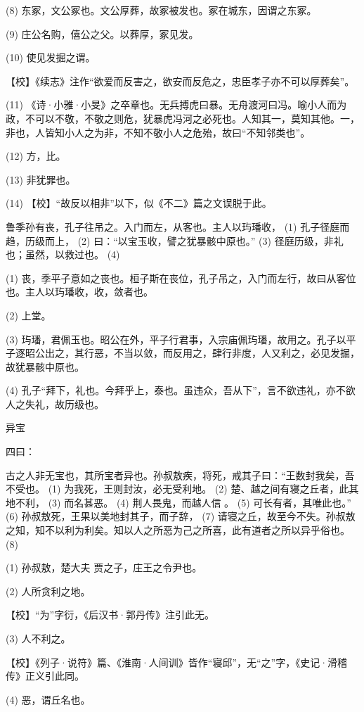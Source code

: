 \documentclass[12pt,UTF8]{ctexbook}
\begin{document}
(8) 东冢，文公冢也。文公厚葬，故冢被发也。冢在城东，因谓之东冢。

(9) 庄公名购，僖公之父。以葬厚，冢见发。

(10) 使见发掘之谓。

【校】《续志》注作“欲爱而反害之，欲安而反危之，忠臣孝子亦不可以厚葬矣”。

(11) 《诗·小雅·小旻》之卒章也。无兵搏虎曰暴。无舟渡河曰冯。喻小人而为政，不可以不敬，不敬之则危，犹暴虎冯河之必死也。人知其一，莫知其他。一，非也，人皆知小人之为非，不知不敬小人之危殆，故曰“不知邻类也”。

(12) 方，比。

(13) 非犹罪也。

(14) 【校】“故反以相非”以下，似《不二》篇之文误脱于此。

鲁季孙有丧，孔子往吊之。入门而左，从客也。主人以玙璠收， (1) 孔子径庭而趋，历级而上， (2) 曰：“以宝玉收，譬之犹暴骸中原也。” (3) 径庭历级，非礼也；虽然，以救过也。 (4)

(1) 丧，季平子意如之丧也。桓子斯在丧位，孔子吊之，入门而左行，故曰从客位也。主人以玙璠收，收，敛者也。

(2) 上堂。

(3) 玙璠，君佩玉也。昭公在外，平子行君事，入宗庙佩玙璠，故用之。孔子以平子逐昭公出之，其行恶，不当以敛，而反用之，肆行非度，人又利之，必见发掘，故犹暴骸中原也。

(4) 孔子“拜下，礼也。今拜乎上，泰也。虽违众，吾从下”，言不欲违礼，亦不欲人之失礼，故历级也。





异宝


四曰：

古之人非无宝也，其所宝者异也。孙叔敖疾，将死，戒其子曰：“王数封我矣，吾不受也。 (1) 为我死，王则封汝，必无受利地。 (2) 楚、越之间有寝之丘者，此其地不利， (3) 而名甚恶。 (4) 荆人畏鬼，而越人信 。 (5) 可长有者，其唯此也。” (6) 孙叔敖死，王果以美地封其子，而子辞， (7) 请寝之丘，故至今不失。孙叔敖之知，知不以利为利矣。知以人之所恶为己之所喜，此有道者之所以异乎俗也。 (8)

(1) 孙叔敖，楚大夫 贾之子，庄王之令尹也。

(2) 人所贪利之地。

【校】“为”字衍，《后汉书·郭丹传》注引此无。

(3) 人不利之。

【校】《列子·说符》篇、《淮南·人间训》皆作“寝邱”，无“之”字，《史记·滑稽传》正义引此同。

(4) 恶，谓丘名也。
\end{document}
